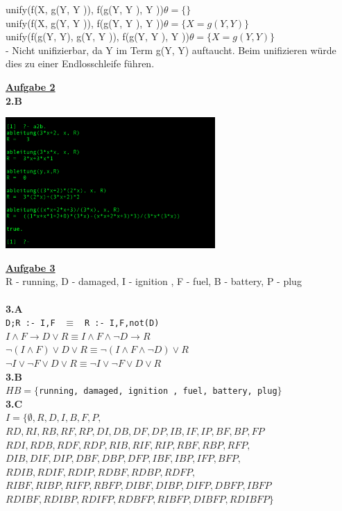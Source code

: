\documentclass[a4paper, dvipsnames]{article}
\begin{document}
unify({\color{red}f}(X, g(Y, Y )), {\color{red}f}(g(Y, Y ), Y ))\quad$\theta = \{\}$\\
unify(f({\color{red}X}, g(Y, Y )), f({\color{red}g(Y, Y )}, Y ))\quad$\theta = \{X = g(Y, Y)\}$\\
unify(f(g(Y, Y), g(Y, Y )), f(g(Y, Y ), Y ))\quad$\theta = \{X = g(Y, Y)\}$\\ - Nicht unifizierbar, da Y im Term g(Y, Y) auftaucht. Beim unifizieren würde dies zu einer Endlosschleife führen.\\

\newpage

\uline{\bfseries{Aufgabe 2}}\\
{\bfseries 2.B}\\
\begin{center}
\includegraphics[width=0.6\textwidth]{Data/A2/1.png}
\end{center}

\uline{\bfseries{Aufgabe 3}}\\
R - running, D - damaged, I - ignition , F - fuel, B - battery, P - plug\\
\\
{\bfseries 3.A}\\
\texttt{D;R :- I,F } $\equiv$ \texttt{ R :- I,F,not(D)}\\
 $I \wedge F \rightarrow D \vee R \equiv I \wedge F \wedge \neg D \rightarrow R$\\
$\neg (I \wedge F) \vee D \vee R \equiv \neg (I \wedge F \wedge \neg D) \vee R$\\
$\neg I \vee \neg F \vee D \vee R \equiv \neg I \vee  \neg F \vee  D \vee R$\\

{\bfseries 3.B}\\
$HB = \lbrace$\texttt{running,  damaged,  ignition ,  fuel,  battery,  plug}$ \rbrace$\\

{\bfseries 3.C}\\
$I = \lbrace \emptyset, R, D, I, B, F, P, $\\
$RD, RI, RB, RF, RP, DI, DB, DF, DP, IB, IF, IP, BF, BP, FP$\\
$RDI, RDB, RDF, RDP, RIB, RIF, RIP, RBF,RBP,RFP,$\\
$DIB, DIF, DIP, DBF, DBP, DFP, IBF, IBP, IFP, BFP, $\\
$RDIB, RDIF, RDIP, RDBF, RDBP, RDFP,$\\
$ RIBF, RIBP, RIFP, RBFP, DIBF, DIBP, DIFP, DBFP, IBFP$\\
$RDIBF, RDIBP, RDIFP, RDBFP, RIBFP, DIBFP, RDIBFP\rbrace$\\
\end{document}
